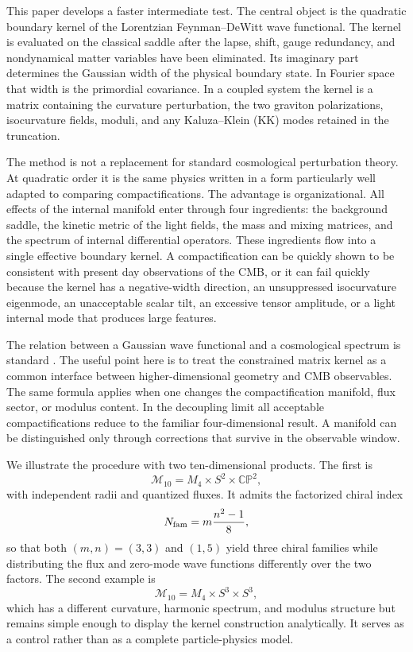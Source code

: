 \documentclass[aps,prd,twocolumn,superscriptaddress,nofootinbib,longbibliography]{revtex4-2}
\newcommand{\cM}{\mathcal M}
\newcommand{\CP}{\mathbb{CP}}
\begin{document}
This paper develops a faster intermediate test. The central object is the quadratic boundary kernel of the Lorentzian Feynman--DeWitt wave functional. The kernel is evaluated on the classical saddle after the lapse, shift, gauge redundancy, and nondynamical matter variables have been eliminated. Its imaginary part determines the Gaussian width of the physical boundary state. In Fourier space that width is the primordial covariance. In a coupled system the kernel is a matrix containing the curvature perturbation, the two graviton polarizations, isocurvature fields, moduli, and any Kaluza--Klein (KK) modes retained in the truncation.

The method is not a replacement for standard cosmological perturbation theory. At quadratic order it is the same physics written in a form particularly well adapted to comparing compactifications. The advantage is organizational. All effects of the internal manifold enter through four ingredients: the background saddle, the kinetic metric of the light fields, the mass and mixing matrices, and the spectrum of internal differential operators. These ingredients flow into a single effective boundary kernel. A compactification can be quickly shown to be consistent with present day observations of the CMB, or it can fail quickly because the kernel has a negative-width direction, an unsuppressed isocurvature eigenmode, an unacceptable scalar tilt, an excessive tensor amplitude, or a light internal mode that produces large features.

The relation between a Gaussian wave functional and a cosmological spectrum is standard \cite{HalliwellHawking1985,PolarskiStarobinsky1996,Maldacena2003}. The useful point here is to treat the constrained matrix kernel as a common interface between higher-dimensional geometry and CMB observables. The same formula applies when one changes the compactification manifold, flux sector, or modulus content. In the decoupling limit all acceptable compactifications reduce to the familiar four-dimensional result. A manifold can be distinguished only through corrections that survive in the observable window.

We illustrate the procedure with two ten-dimensional products. The first is
\begin{equation}
\cM_{10}=M_4\times S^2\times\CP^2,
\end{equation}
with independent radii and quantized fluxes. It admits the factorized chiral index
\begin{equation}
N_{\rm fam}=m\frac{n^2-1}{8},
\end{equation}
so that both $(m,n)=(3,3)$ and $(1,5)$ yield three chiral families while distributing the flux and zero-mode wave functions differently over the two factors. The second example is
\begin{equation}
\cM_{10}=M_4\times S^3\times S^3,
\end{equation}
which has a different curvature, harmonic spectrum, and modulus structure but remains simple enough to display the kernel construction analytically. It serves as a control rather than as a complete particle-physics model.
\end{document}
